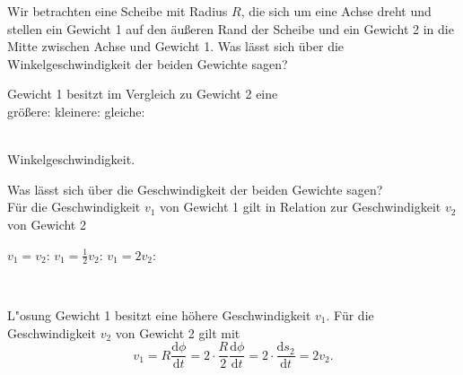   \begin{MExercises}


\begin{MExercise}
Wir betrachten eine Scheibe mit Radius $R$, die sich um eine Achse dreht und stellen ein Gewicht 1 auf den \"au{\ss}eren Rand der Scheibe und ein Gewicht 2 in die Mitte zwischen Achse und Gewicht 1. Was l\"asst sich \"uber die Winkelgeschwindigkeit der beiden Gewichte sagen? \\

\begin{MQuestionGroup}
                  Gewicht 1 besitzt im Vergleich zu Gewicht 2 eine\\
                  gr\"o{\ss}ere:  
                  kleinere:  
                  gleiche:  
                  \end{MQuestionGroup}\\
                  Winkelgeschwindigkeit.
                  

\end{MExercise}

\begin{MExercise}
Was l\"asst sich \"uber die Geschwindigkeit der beiden Gewichte sagen?
\\

F\"ur die Geschwindigkeit $v_1$ von Gewicht 1 gilt in Relation zur Geschwindigkeit $v_2$ von Gewicht 2\\
\begin{MQuestionGroup}
                  $v_1=v_2$:  
                  $v_1=\frac{1}{2}v_2$:  
                  $v_1=2v_2$:  
                  \end{MQuestionGroup}\\
                  
                  
\begin{MHint}{L"osung}
Gewicht 1 besitzt eine h\"ohere Geschwindigkeit $v_1$. F\"ur die Geschwindigkeit $v_2$ von Gewicht 2 gilt mit 
\begin{equation*}
v_1=R\frac{\textrm{d}\phi}{\textrm{d}t}=2\cdot \frac{R}{2}\frac{\textrm{d}\phi}{\textrm{d}t}=2\cdot\frac{\textrm{d}s_2}{\textrm{d}t}=2v_2.
\end{equation*}
\end{MHint}
\end{MExercise}

\end{MExercises}

